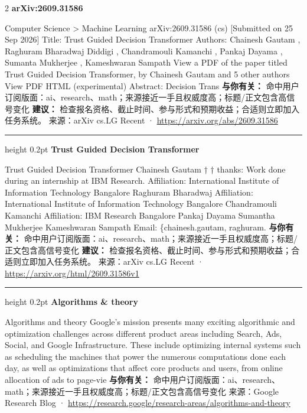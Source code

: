 \documentclass[10.5pt]{ctexart}
\begin{document}
\begin{multicols}{2}
{\large\bfseries arXiv:2609.31586}\par
Computer Science > Machine Learning arXiv:2609.31586 (cs) [Submitted on 25 Sep 2026] Title: Trust Guided Decision Transformer Authors: Chainesh Gautam , Raghuram Bharadwaj Diddigi , Chandramouli Kamanchi , Pankaj Dayama , Sumanta Mukherjee , Kameshwaran Sampath View a PDF of the paper titled Trust Guided Decision Transformer, by Chainesh Gautam and 5 other authors View PDF HTML (experimental) Abstract: Decision Trans
\textbf{与你有关：} 命中用户订阅版面：ai、research、math；来源接近一手且权威度高；标题/正文包含高信号变化
\textbf{建议：} 检查报名资格、截止时间、参与形式和预期收益；合适则立即加入任务系统。
{\footnotesize\color{ormuted} 来源：arXiv cs.LG Recent · \url{https://arxiv.org/abs/2609.31586}}
\vspace{2mm}
\hrule height 0.2pt
\vspace{2mm}
{\large\bfseries Trust Guided Decision Transformer}\par
Trust Guided Decision Transformer Chainesh Gautam † † thanks: Work done during an internship at IBM Research. Affiliation: International Institute of Information Technology Bangalore Raghuram Bharadwaj Affiliation: International Institute of Information Technology Bangalore Chandramouli Kamanchi Affiliation: IBM Research Bangalore Pankaj Dayama Sumantha Mukherjee Kameshwaran Sampath Email: \{chainesh.gautam, raghuram.
\textbf{与你有关：} 命中用户订阅版面：ai、research、math；来源接近一手且权威度高；标题/正文包含高信号变化
\textbf{建议：} 检查报名资格、截止时间、参与形式和预期收益；合适则立即加入任务系统。
{\footnotesize\color{ormuted} 来源：arXiv cs.LG Recent · \url{https://arxiv.org/html/2609.31586v1}}
\vspace{2mm}
\hrule height 0.2pt
\vspace{2mm}
{\large\bfseries Algorithms \& theory}\par
Algorithms and theory Google’s mission presents many exciting algorithmic and optimization challenges across different product areas including Search, Ads, Social, and Google Infrastructure. These include optimizing internal systems such as scheduling the machines that power the numerous computations done each day, as well as optimizations that affect core products and users, from online allocation of ads to page-vie
\textbf{与你有关：} 命中用户订阅版面：ai、research、math；来源接近一手且权威度高；标题/正文包含高信号变化
{\footnotesize\color{ormuted} 来源：Google Research Blog · \url{https://research.google/research-areas/algorithms-and-theory}}

\end{multicols}
\end{document}
